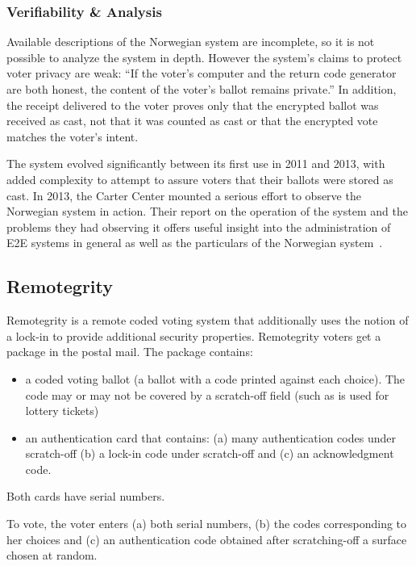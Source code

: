 \subsubsection{Verifiability \& Analysis}

Available descriptions of the Norwegian system are incomplete, so it
is not possible to analyze the system in depth. However the system's
claims to protect voter privacy are weak: ``If the voter's computer
and the return code generator are both honest, the content of the
voter's ballot remains private.'' In addition, the receipt delivered
to the voter proves only that the encrypted ballot was received as
cast, not that it was counted as cast or that the encrypted vote
matches the voter's intent.

The system evolved significantly between its first use in 2011 and
2013, with added complexity to attempt to assure voters that their
ballots were stored as cast. In 2013, the Carter Center mounted a
serious effort to observe the Norwegian system in action. Their
report on the operation of the system and the problems
they had observing it offers useful insight into the administration of
E2E systems in general as well as the particulars of the Norwegian
system~\cite{carter2013}.

\subsection{Remotegrity~\cite{zagorski2013}}

Remotegrity is a remote coded voting system that additionally uses the
notion of a lock-in to provide additional security
properties. Remotegrity voters get a package in the postal mail. The
package contains:
\begin{itemize}
  \item a coded voting ballot (a ballot with a code printed against
    each choice). The code may or may not be covered by a scratch-off
    field (such as is used for lottery tickets)
  \item an authentication card that contains: (a) many authentication
    codes under scratch-off (b) a lock-in code under scratch-off and
    (c) an acknowledgment code.
\end{itemize}
Both cards have serial numbers.

To vote, the voter enters (a) both serial numbers, (b) the codes
corresponding to her choices and (c) an authentication code obtained
after scratching-off a surface chosen at random.

